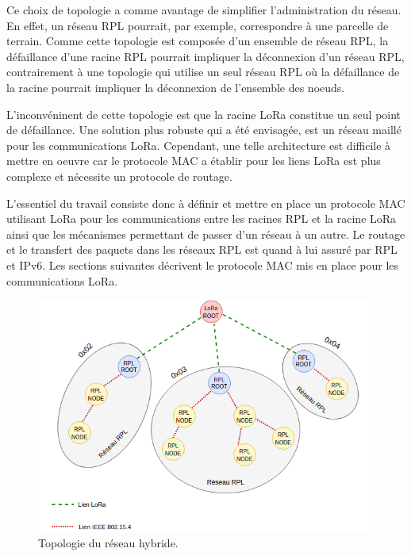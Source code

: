 Ce choix de topologie a comme avantage de simplifier l'administration du réseau. En effet, un réseau RPL pourrait, par exemple, correspondre à une parcelle de terrain. Comme cette topologie est composée d'un ensemble de réseau RPL, la défaillance d'une racine RPL pourrait impliquer la déconnexion d'un réseau RPL, contrairement à une topologie qui utilise un seul réseau RPL où la défaillance de la racine pourrait impliquer la déconnexion de l'ensemble des noeuds.

L'inconvéninent de cette topologie est que la racine LoRa constitue un seul point de défaillance. Une solution plus robuste qui a été envisagée, est un réseau maillé pour les communications LoRa. Cependant, une telle architecture est difficile à mettre en oeuvre car le protocole MAC a établir pour les liens LoRa est plus complexe et nécessite un protocole de routage.

L'essentiel du travail consiste donc à définir et mettre en place un protocole MAC utilisant LoRa pour les communications entre les racines RPL et la racine LoRa ainsi que les mécanismes permettant de passer d'un réseau à un autre. Le routage et le transfert des paquets dans les réseaux RPL est quand à lui assuré par RPL et IPv6. Les sections suivantes décrivent le protocole MAC mis en place pour les communications LoRa.

\begin{figure}[H]
    \centering
    \includegraphics[scale=0.5]{res/pictures/loramac-topologie.drawio.png}
    \caption{Topologie du réseau hybride.}
    \label{fig:archi-topologie}
\end{figure}

